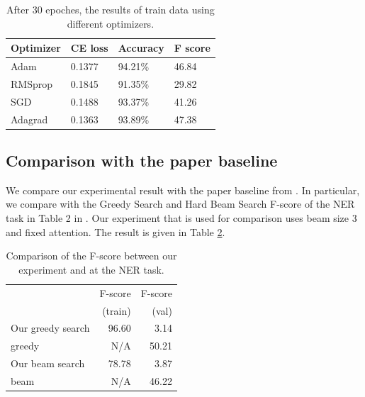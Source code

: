 \documentclass[11pt,a4paper]{article}
\begin{document}
    
\begin{table}[ht]
\centering
\caption{After 30 epoches, the results of train data using different optimizers.}
\label{opti}
\begin{tabular}{llll}
\hline
Optimizer        & CE loss & Accuracy & F score \\ \hline
Adam    & 0.1377  & 94.21\%  & 46.84   \\
RMSprop & 0.1845  & 91.35\%  & 29.82   \\
SGD     & 0.1488  & 93.37\%  & 41.26   \\
Adagrad & 0.1363  & 93.89\%  & 47.38   \\ \hline
\end{tabular}
\end{table}






\subsection{Comparison with the paper baseline}

We compare our experimental result with the paper baseline from \cite{goyal2017continuous}. In particular, we compare with the Greedy Search and Hard Beam Search F-score of the NER task in Table 2 in \cite{goyal2017continuous}. Our experiment that is used for comparison uses beam size 3 and fixed attention. The result is given in Table \ref{tab:comp}.

\begin{table}[ht]
\centering
\caption{Comparison of the F-score between our experiment and \cite{goyal2017continuous} at the NER task.}
\label{tab:comp}
\begin{tabular}{lrr}
\toprule
                  & F-score  & F-score    \\
                  & (train)  & (val)    \\ \midrule
Our greedy search          & 96.60            & 3.14               \\
\cite{goyal2017continuous} greedy  & N/A              & 50.21              \\
Our beam search          & 78.78            & 3.87               \\
\cite{goyal2017continuous} beam  & N/A              & 46.22              \\ \bottomrule
\end{tabular}
\end{table}
\end{document}
